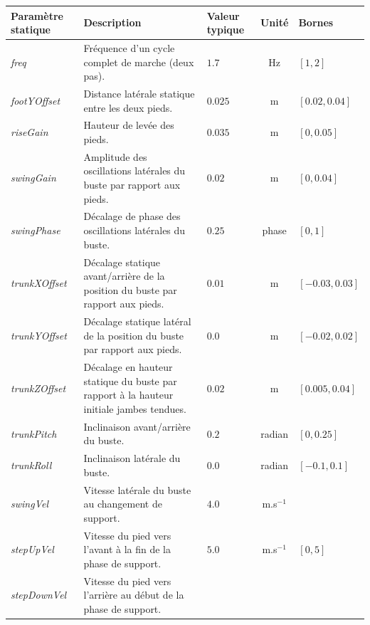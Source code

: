 \begin{table}[htbp]
\begin{center}
    \begin{tabular}{|p{3.5cm}|p{6cm}|p{1.5cm}|c|l|}
        \hline
        Paramètre statique & Description & Valeur typique & Unité & Bornes\\
        \hline
        \textit{freq} & 
            Fréquence d'un cycle complet de marche (deux pas). & 
            $1.7$ & Hz & $[1,2]$\\
        \textit{footYOffset} & 
            Distance latérale statique entre les deux pieds. & 
            $0.025$ & m & $[0.02, 0.04]$\\
        \textit{riseGain} & 
            Hauteur de levée des pieds. & 
            $0.035$ & m & $[0,0.05]$\\
        \textit{swingGain} & 
            Amplitude des oscillations latérales du buste par rapport aux pieds. & 
            $0.02$ & m & $[0,0.04]$\\
        \textit{swingPhase} & 
            Décalage de phase des oscillations latérales du buste. & 
            $0.25$ & phase & $[0,1]$\\
        \textit{trunkXOffset} & 
            Décalage statique avant/arrière de la position du buste par rapport aux pieds. & 
            $0.01$ & m & $[-0.03,0.03]$\\
        \textit{trunkYOffset} & 
            Décalage statique latéral de la position du buste par rapport aux pieds. & 
            $0.0$ & m & $[-0.02,0.02]$\\
        \textit{trunkZOffset} & 
            Décalage en hauteur statique du buste par rapport à la hauteur initiale jambes tendues. & 
            $0.02$ & m & $[0.005,0.04]$\\
        \textit{trunkPitch} & 
            Inclinaison avant/arrière du buste. & 
            $0.2$ & radian & $[0,0.25]$\\
        \textit{trunkRoll} & 
            Inclinaison latérale du buste. & 
            $0.0$ & radian & $[-0.1, 0.1]$\\
        \textit{swingVel} & 
            Vitesse latérale du buste au changement de support. & 
            $4.0$ & m.s$^{-1}$ & \\
        \textit{stepUpVel} & 
            Vitesse du pied vers l'avant à la fin de la phase de support. &
            $5.0$ & m.s$^{-1}$ & $[0,5]$\\
        \textit{stepDownVel} & 
            Vitesse du pied vers l'arrière au début de la phase de support. &

\end{tabular}
\end{center}
\end{table}
